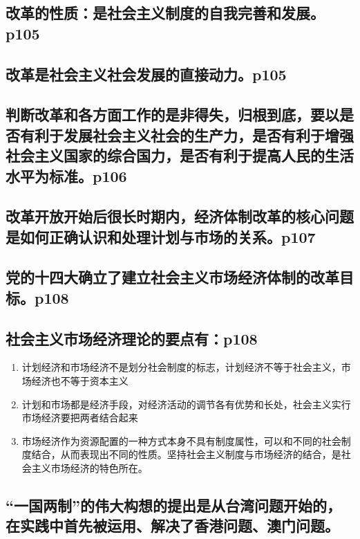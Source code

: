 \documentclass[UTF8]{ctexart}
\begin{document}
\subsection{改革的性质：是社会主义制度的自我完善和发展。p105}
\subsection{改革是社会主义社会发展的直接动力。p105}
\subsection{判断改革和各方面工作的是非得失，归根到底，要以是否有利于发展社会主义社会的生产力，是否有利于增强社会主义国家的综合国力，是否有利于提高人民的生活水平为标准。p106}
\subsection{改革开放开始后很长时期内，经济体制改革的核心问题是如何正确认识和处理计划与市场的关系。p107}
\subsection{党的十四大确立了建立社会主义市场经济体制的改革目标。p108}
\newpage
\subsection{社会主义市场经济理论的要点有：p108}
\begin{enumerate}[(1)]
    \item 计划经济和市场经济不是划分社会制度的标志，计划经济不等于社会主义，市场经济也不等于资本主义
    \item 计划和市场都是经济手段，对经济活动的调节各有优势和长处，社会主义实行市场经济要把两者结合起来
    \item 市场经济作为资源配置的一种方式本身不具有制度属性，可以和不同的社会制度结合，从而表现出不同的性质。坚持社会主义制度与市场经济的结合，是社会主义市场经济的特色所在。
\end{enumerate}
\subsection{“一国两制”的伟大构想的提出是从台湾问题开始的，在实践中首先被运用、解决了香港问题、澳门问题。}
\end{document}
